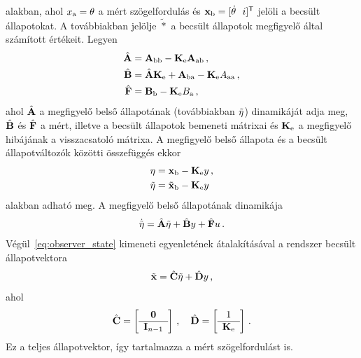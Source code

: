 alakban, ahol $x_{\mathrm{a}} = \theta$ a mért szögelfordulás és 
$\mathbf{x}_{\mathrm{b}} = [\dot \theta~~i]^{\mathsf T}$ jelöli a becsült állapotokat.
A továbbiakban jelölje $\tilde{*}$ a becsült állapotok megfigyelő által számított értékeit. Legyen
\begin{align}\label{eq:observer_params}
    \begin{split}
    \hat{\mathbf{A}} &= \mathbf{A}_{\mathrm{bb}} - \mathbf{K}_{\mathrm{e}} \mathbf{A}_{\mathrm{ab}}\,,\\
    \hat{\mathbf{B}} &= \hat{\mathbf{A}} \mathbf{K}_{\mathrm{e}} + \mathbf{A}_{\mathrm{ba}} - \mathbf{K}_{\mathrm{e}} A_{\mathrm{aa}}\,,\\
    \hat{\mathbf{F}} &= \mathbf{B}_{\mathrm{b}} - \mathbf{K}_{\mathrm{e}} B_{\mathrm{a}}\,,
    \end{split}
\end{align}
ahol $\hat{\mathbf{A}}$ a megfigyelő belső állapotának (továbbiakban $\tilde{\mathbf{\eta}}$) 
dinamikáját adja meg, $\hat{\mathbf{B}}$ és $\hat{\mathbf{F}}$ a mért, illetve a becsült állapotok 
bemeneti mátrixai és $\mathbf{K}_{\mathrm{e}}$ a megfigyelő hibájának a visszacsatoló mátrixa. 
A megfigyelő belső állapota és a becsült állapotváltozók közötti összefüggés ekkor
\begin{align}
    \begin{split}
    \mathbf{\eta} &= \mathbf{x}_{\mathrm{b}} - \mathbf{K}_{\mathrm{e}} y\,,\\
    \tilde{\mathbf{\eta}} &= \tilde{\mathbf{x}}_{\mathrm{b}} - \mathbf{K}_{\mathrm{e}} y
    \end{split}
\end{align}
alakban adható meg. A megfigyelő belső állapotának dinamikája
\begin{align}
    \begin{split}
    \dot{\tilde{\mathbf{\eta}}} = \hat{\mathbf{A}} \tilde{\mathbf{\eta}} + \hat{\mathbf{B}} y + \hat{\mathbf{F}} u\,.
    \end{split}
\end{align}
Végül~\eqref{eq:observer_state} kimeneti egyenletének átalakításával a rendszer becsült állapotvektora
\begin{align}
    \tilde{\mathbf{x}} = \hat{\mathbf{C}} \tilde{\mathbf{\eta}} + \hat{\mathbf{D}} y\,,
\end{align}
ahol
\begin{align}
    \hat{\mathbf{C}} = 
    \left[\begin{array}{c}
        \mathbf{0} \\ \hline
        \mathbf{I}_{n-1}
    \end{array}\right]\,,
    \quad
    \hat{\mathbf{D}} = 
    \left[\begin{array}{c}
        1 \\ \hline
        \mathbf{K}_{\mathrm{e}}
    \end{array}\right]\,.
\end{align}
Ez a teljes állapotvektor, így tartalmazza a mért szögelfordulást is.

